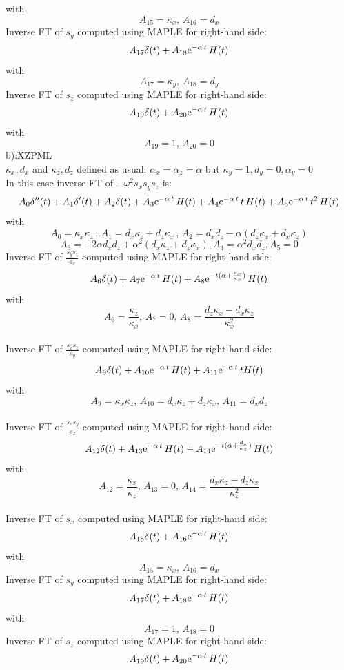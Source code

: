 \documentclass[onecolumn,extra]{gji_modified_cours_UPPA}
\begin{document}
with
$$A_{15}= \kappa_x, \, A_{16}=d_x $$
\noindent
Inverse FT of $s_y$ computed using MAPLE for right-hand side:
$$A_{17}\delta(t) + A_{18} {\rm e}^{-\alpha \,t} \, H(t) $$
with
$$A_{17}= \kappa_y, \, A_{18}=d_y $$
\noindent
Inverse FT of $s_z$ computed using MAPLE for right-hand side:
$$A_{19}\delta(t) + A_{20} {\rm e}^{-\alpha \,t} \, H(t) $$
with
$$A_{19}= 1, \, A_{20}=0 $$
b):XZPML\\
$\kappa_x,d_x$ and $\kappa_z,d_z$ defined as usual; $\alpha_x=\alpha_z=\alpha$ but $\kappa_y = 1 ,d_y= 0,\alpha_y= 0$\\
In this case inverse FT of $-\omega^2 s_x s_y s_z$ is:
$$A_0 \delta''(t) + A_1 \delta'(t) + A_2 \delta(t)
+ A_3 {\rm e}^{-\alpha\,t} \, H(t)
+ A_4 {\rm e}^{-\alpha\,t} \,t\, H(t)
+ A_5 {\rm e}^{-\alpha\,t} \,t^{2} \,H(t)$$
with
$$A_0 = \kappa_x \kappa_z \, , \, A_1 =d_x \kappa_z + d_z \kappa_x \, , \,A_2 = d_x d_z -\alpha(d_z \kappa_x + d_x \kappa_z)$$
$$A_3= - 2 \alpha d_x d_z +\alpha ^2 (d_x \kappa_z +  d_z \kappa_x),A_4= \alpha ^2 d_x d_z, A_5=0 $$
\noindent
Inverse FT of $\frac{s_y s_z}{s_x}$ computed using MAPLE for right-hand side:\\
$$A_6\delta(t) + A_7 {\rm e}^{-\alpha\,t} \, H(t) + A_8 {\rm e}^{-t(\alpha+\frac{d_x}{\kappa_x})} \, H(t) $$
with
$$A_6=\frac{\kappa_z}{\kappa_x},\,A_7=0,\,A_8=\frac{d_z \kappa_x-d_x \kappa_z }{\kappa^2_x} $$\\
\noindent
Inverse FT of $\frac{s_x s_z}{s_y}$ computed using MAPLE for right-hand side:\\
$$A_9\delta(t) + A_{10} {\rm e}^{-\alpha\,t} \, H(t) + A_{11} {\rm e}^{-\alpha\,t} \, tH(t) $$
with
$$A_9=\kappa_x \kappa_z,\,A_{10}=d_x\kappa_z+d_z\kappa_x,
\,A_{11}=d_xd_z$$\\
\noindent
Inverse FT of $\frac{s_x s_y}{s_z}$ computed using MAPLE for right-hand side:\\
$$A_{12}\delta(t) + A_{13} {\rm e}^{-\alpha\,t} \, H(t) + A_{14} {\rm e}^{-t(\alpha+\frac{d_z}{\kappa_z})} \, H(t) $$
with
$$A_{12}=\frac{\kappa_x}{\kappa_z},\,A_{13}=0,
\,A_{14}=\frac{d_x \kappa_z-d_z \kappa_x }{\kappa^2_z}$$\\
\noindent
Inverse FT of $s_x$ computed using MAPLE for right-hand side:
$$A_{15}\delta(t) + A_{16} {\rm e}^{-\alpha \,t} \, H(t) $$
with
$$A_{15}= \kappa_x, \, A_{16}=d_x $$
\noindent
Inverse FT of $s_y$ computed using MAPLE for right-hand side:
$$A_{17}\delta(t) + A_{18} {\rm e}^{-\alpha \,t} \, H(t) $$
with
$$A_{17}= 1, \, A_{18}=0 $$
\noindent
Inverse FT of $s_z$ computed using MAPLE for right-hand side:
$$A_{19}\delta(t) + A_{20} {\rm e}^{-\alpha \,t} \, H(t) $$
\end{document}
